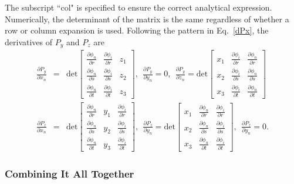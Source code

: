 The subscript ``col" is specified to ensure the correct analytical expression. Numerically, the determinant of the matrix is the same regardless of whether a row or column expansion is used. Following the pattern in Eq.\ \eqref{dPx}, the derivatives of $P_y$ and $P_z$ are 
%
\begin{eqnarray}
\frac{\partial P_y}{\partial x_n} &=&
\text{det} \begin{bmatrix}
\frac{\partial \phi_n}{\partial r} & \frac{\partial \phi_i}{\partial r} & z_1 \\
\frac{\partial \phi_n}{\partial s} & \frac{\partial \phi_i}{\partial s} & z_2 \\
\frac{\partial \phi_n}{\partial t} & \frac{\partial \phi_i}{\partial t} & z_3 
\end{bmatrix}, \ \ 
%
\frac{\partial P_y}{\partial y_n} = 0, \ \ 
%
\frac{\partial P_y}{\partial z_n} =
\text{det} \begin{bmatrix}
x_1 & \frac{\partial \phi_i}{\partial r} & \frac{\partial \phi_n}{\partial r} \\
x_2 & \frac{\partial \phi_i}{\partial s} & \frac{\partial \phi_n}{\partial s} \\
x_3 & \frac{\partial \phi_i}{\partial t} & \frac{\partial \phi_n}{\partial t} 
\end{bmatrix} \nonumber\\
\frac{\partial P_z}{\partial x_n} &=&
\text{det} \begin{bmatrix}
\frac{\partial \phi_n}{\partial r} & y_1 & \frac{\partial \phi_i}{\partial r}  \\
\frac{\partial \phi_n}{\partial s} & y_2 & \frac{\partial \phi_i}{\partial s} \\
\frac{\partial \phi_n}{\partial t} & y_3 & \frac{\partial \phi_i}{\partial t}  
\end{bmatrix}, \ \
%
\frac{\partial P_z}{\partial y_n} =
\text{det} \begin{bmatrix}
x_1 & \frac{\partial \phi_n}{\partial r} &  \frac{\partial \phi_i}{\partial r}  \\
x_2 & \frac{\partial \phi_n}{\partial s} &  \frac{\partial \phi_i}{\partial s} \\
x_3 & \frac{\partial \phi_n}{\partial t} &  \frac{\partial \phi_i}{\partial t}  
\end{bmatrix}, \ \
%
\frac{\partial P_z}{\partial y_n} = 0 .
\label{dPy_and_dPz}
\end{eqnarray}
% 

\subsubsection{Combining It All Together}

